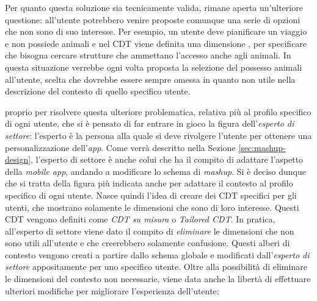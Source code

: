 Per quanto questa soluzione sia tecnicamente valida, rimane aperta un'ulteriore questione: all'utente potrebbero venire proposte comunque una serie di opzioni che non sono di suo interesse. Per esempio, un utente deve pianificare un viaggio e non possiede animali e nel CDT viene definita una dimensione , per specificare che bisogna cercare strutture che ammettano l'accesso anche agli animali. In questa situazione verrebbe ogni volta proposta la selezione del possesso animali all'utente, scelta che dovrebbe essere sempre omessa in quanto non utile nella descrizione del contesto di quello specifico utente.

\upe proprio per risolvere questa ulteriore problematica, relativa più al profilo specifico di ogni utente, che si è pensato di far entrare in gioco la figura dell'\emph{esperto di settore}: l'esperto è la persona alla quale si deve rivolgere l'utente per ottenere una personalizzazione dell'\emph{app}. Come verrà descritto nella Sezione \ref{sec:mashup-design}, l'esperto di settore è anche colui che ha il compito di adattare l'aspetto della \emph{mobile app}, andando a  modificare lo schema di \emph{mashup}. Si è deciso dunque che si tratta della figura più indicata anche per adattare il contesto al profilo specifico di ogni utente. Nasce quindi l'idea di creare dei CDT specifici per gli utenti, che mostrano solamente le dimensioni che sono di loro interesse. Questi CDT vengono definiti come \emph{CDT su misura} o \emph{Tailored CDT}. In pratica, all'esperto di settore viene dato il compito di \emph{eliminare} le dimensioni che non sono utili all'utente e che creerebbero solamente confusione. Questi alberi di contesto vengono creati a partire dallo schema globale e modificati dall'\emph{esperto di settore} appositamente per uno specifico utente. Oltre alla possibilità di eliminare le dimensioni del contesto non necessarie, viene data anche la libertà di effettuare ulteriori modifiche per migliorare l'esperienza dell'utente:

